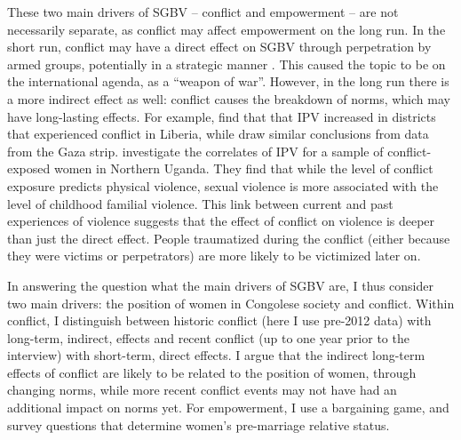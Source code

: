 These two main drivers of SGBV -- conflict and empowerment -- are not necessarily separate, as conflict may affect empowerment on the long run. In the short run, conflict may have a direct effect on SGBV through perpetration by armed groups, potentially in a strategic manner \citep{Baaz2013,Kirby2015}. This  caused the topic to be on the international agenda, as a ``weapon of war''. However, in the long run there is a more indirect effect as well: conflict causes the breakdown of norms, which may have long-lasting effects. For example, \cite{Kelly2018} find that that IPV increased in districts that experienced conflict in Liberia, while \cite{Muller2019} draw similar conclusions from data from the Gaza strip. \cite{Saile2013} investigate the correlates of IPV for a sample of conflict-exposed women in Northern Uganda. They find that while the level of conflict exposure predicts physical violence, sexual violence is more associated with the level of childhood familial violence. This link between current and past experiences of violence suggests that the effect of conflict on violence is deeper than just the direct effect. People traumatized during the conflict (either because they were victims or perpetrators) are more likely to be victimized later on. 

In answering the question what the main drivers of SGBV are, I thus consider two main drivers:  the position of women in Congolese society and conflict. Within conflict, I distinguish between historic conflict (here I use pre-2012 data) with long-term, indirect, effects and recent conflict (up to one year prior to the interview) with short-term, direct effects. I argue that the indirect long-term effects of conflict are likely to be related to the position of women, through changing norms, while more recent conflict events may not have had an additional impact on norms yet. For empowerment, I use a bargaining game, and survey questions that determine women's pre-marriage relative status. 

